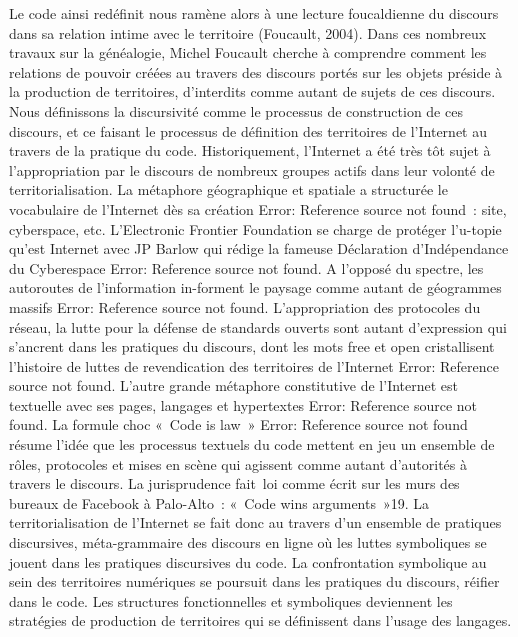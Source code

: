 Le code ainsi redéfinit nous ramène alors à une lecture foucaldienne du discours dans sa relation intime avec le territoire (Foucault, 2004). Dans ces nombreux travaux sur la généalogie, Michel Foucault cherche à comprendre comment les relations de pouvoir créées au travers des discours portés sur les objets préside à la production de territoires, d’interdits comme autant de sujets de ces discours. Nous définissons la discursivité comme le processus de construction de ces discours, et ce faisant le processus de définition des territoires de l’Internet au travers de la pratique du code. Historiquement, l’Internet a été très tôt sujet à l’appropriation par le discours de nombreux groupes actifs dans leur volonté de territorialisation. La métaphore géographique et spatiale a structurée le vocabulaire de l’Internet dès sa création Error: Reference source not found : site, cyberspace, etc. L’Electronic Frontier Foundation se charge de protéger l’u-topie qu’est Internet avec JP Barlow qui rédige la fameuse Déclaration d’Indépendance du Cyberespace Error: Reference source not found. A l’opposé du spectre, les autoroutes de l’information in-forment le paysage comme autant de géogrammes massifs Error: Reference source not found. L’appropriation des protocoles du réseau, la lutte pour la défense de standards ouverts sont autant d’expression qui s’ancrent dans les pratiques du discours, dont les mots free et open cristallisent l’histoire de luttes de revendication des territoires de l’Internet Error: Reference source not found. L’autre grande métaphore constitutive de l’Internet est textuelle avec ses pages, langages et hypertextes Error: Reference source not found. La formule choc « Code is law » Error: Reference source not found résume l’idée  que les processus textuels du code mettent en jeu un ensemble de rôles, protocoles et mises en scène qui agissent comme autant d’autorités à travers le discours. La jurisprudence fait loi comme écrit sur les murs des bureaux de Facebook à Palo-Alto : « Code wins arguments »19. La territorialisation de l’Internet se fait donc au travers d’un ensemble de pratiques discursives, méta-grammaire des discours en ligne où les luttes symboliques se jouent dans les pratiques discursives du code. La confrontation symbolique au sein des territoires numériques se poursuit dans les pratiques du discours, réifier dans le code. Les structures fonctionnelles et symboliques deviennent les stratégies de production de territoires qui se définissent dans l’usage des langages. 

